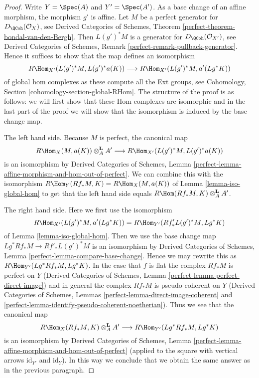 \begin{proof}
Write $Y = \Spec(A)$ and $Y' = \Spec(A')$. As a base change of an affine
morphism, the morphism $g'$ is affine. Let $M$ be a perfect generator
for $D_\QCoh(\mathcal{O}_X)$, see Derived Categories of Schemes, Theorem
\ref{perfect-theorem-bondal-van-den-Bergh}. Then $L(g')^*M$ is a
generator for $D_\QCoh(\mathcal{O}_{X'})$, see
Derived Categories of Schemes, Remark \ref{perfect-remark-pullback-generator}.
Hence it suffices to show that the map defines an isomorphism
$$
R\Hom_{X'}(L(g')^*M, L(g')^*a(K))
\longrightarrow
R\Hom_{X'}(L(g')^*M, a'(Lg^*K))
$$
of global hom complexes as these compute all the Ext groups, see
Cohomology, Section \ref{cohomology-section-global-RHom}.
The structure of the proof is as follows: we will first show that
these Hom complexes are isomorphic and in the last part of the proof
we will show that the isomorphism is induced by the base change map.

\medskip\noindent
The left hand side. Because $M$ is perfect, the canonical map
$$
R\Hom_X(M, a(K)) \otimes^\mathbf{L}_A A'
\longrightarrow
R\Hom_{X'}(L(g')^*M, L(g')^*a(K))
$$
is an isomorphism by Derived Categories of Schemes, Lemma
\ref{perfect-lemma-affine-morphism-and-hom-out-of-perfect}.
We can combine this with the isomorphism
$R\Hom_Y(Rf_*M, K) = R\Hom_X(M, a(K))$
of Lemma \ref{lemma-iso-global-hom}
to get that the left hand side equals
$R\Hom(Rf_*M, K) \otimes^\mathbf{L}_A A'$.

\medskip\noindent
The right hand side. Here we first use the isomorphism
$$
R\Hom_{X'}(L(g')^*M, a'(Lg^*K)) = R\Hom_{Y'}(Rf'_*L(g')^*M, Lg^*K)
$$
of Lemma \ref{lemma-iso-global-hom}. Then we use the base change
map $Lg^*Rf_*M \to Rf'_*L(g')^*M$ is an isomorphism by
Derived Categories of Schemes, Lemma \ref{perfect-lemma-compare-base-change}.
Hence we may rewrite this as $R\Hom_{Y'}(Lg^*Rf_*M, Lg^*K)$.
In the case that $f$ is flat the complex $Rf_*M$ is perfect on $Y$
(Derived Categories of Schemes, Lemma \ref{perfect-lemma-perfect-direct-image})
and in general the complex $Rf_*M$ is pseudo-coherent on $Y$
(Derived Categories of Schemes, Lemmas
\ref{perfect-lemma-direct-image-coherent} and
\ref{perfect-lemma-identify-pseudo-coherent-noetherian}).
Thus we see that the canonical map
$$
R\Hom_X(Rf_*M, K) \otimes^\mathbf{L}_A A'
\longrightarrow
R\Hom_{Y'}(Lg^*Rf_*M, Lg^*K)
$$
is an isomorphism by Derived Categories of Schemes, Lemma
\ref{perfect-lemma-affine-morphism-and-hom-out-of-perfect}
(applied to the square with vertical arrows $\text{id}_{Y'}$
and $\text{id}_Y$). In this way we conclude that we obtain
the same answer as in the previous paragraph.


\end{proof}
